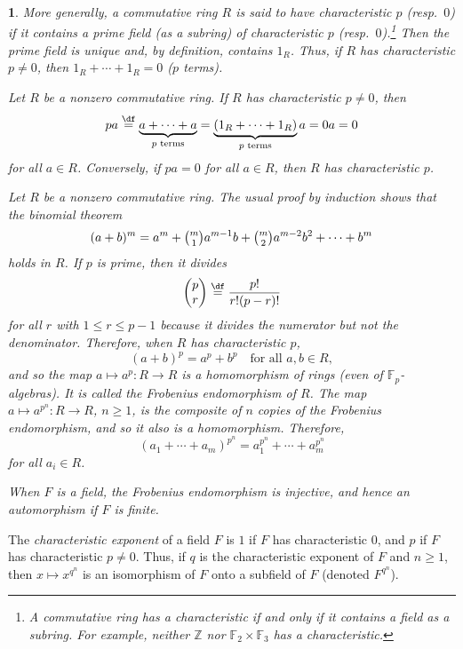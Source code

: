 \documentclass[a4paper,11pt,final,openany]{memoir}
\newtheorem{plain}[X]{}
\theoremstyle{nonumberplain}
\begin{document}
\begin{plain}
\label{ef3}More generally, a commutative ring $R$ is said to have
\emph{characteristic} $p$ (resp.~$0$) if it contains a prime field (as a
subring) of characteristic $p$ (resp.~$0$).\footnote{A commutative ring has a
characteristic if and only if it contains a field as a subring. For example,
neither $\mathbb{Z}{}$ nor $\mathbb{F}{}_{2}\times\mathbb{F}{}_{3}$ has a
characteristic.} Then the prime field is unique and, by definition, contains
$1_{R}$. Thus, if $R$ has characteristic $p\neq0$, then $1_{R}+\cdots+1_{R}=0$
($p$ terms).

Let $R$ be a nonzero commutative ring. If $R$ has characteristic $p\neq0$,
then%
\[
pa\overset{\df}{=}\underbrace{a+\cdots+a}_{p\text{ terms}%
}=\underbrace{(1_{R}+\cdots+1_{R})}_{p\text{ terms}}a=0a=0
\]
for all $a\in R$. Conversely, if $pa=0$ for all $a\in R$, then $R$ has
characteristic $p$.

Let $R$ be a nonzero commutative ring. The usual proof by induction shows that
the binomial theorem%
\[
(a+b)^{m}=a^{m}+\tbinom{m}{1}a^{m-1}b+\tbinom{m}{2}a^{m-2}b^{2}+\cdots+b^{m}%
\]
holds in $R$. If $p$ is prime, then it divides%
\[%
\begin{pmatrix}
p\\
r
\end{pmatrix}
\overset{\df}{=}\frac{p!}{r!(p-r)!}%
\]
for all $r$ with $1\leq r\leq p-1$ because it divides the numerator but not
the denominator. Therefore, when $R$ has characteristic $p$,
\[
(a+b)^{p}=a^{p}+b^{p}\quad\text{for all }a,b\in R,
\]
and so the map $a\mapsto a^{p}\colon R\rightarrow R$ is a homomorphism of
rings (even of $\mathbb{F}{}_{p}$-algebras). It is called the \emph{Frobenius
endomorphism\/}%
of $R$. The map $a\mapsto a^{p^{n}}\colon R\rightarrow R$, $n\geq1$, is the
composite of $n$ copies of the Frobenius endomorphism, and so it also is a
homomorphism. Therefore,%
\[
(a_{1}+\cdots+a_{m})^{p^{n}}=a_{1}^{p^{n}}+\cdots+a_{m}^{p^{n}}%
\]
for all $a_{i}\in R$.

When $F$ is a field, the Frobenius endomorphism is injective, and hence an
automorphism if $F$ is finite.
\end{plain}

The
%
\emph{characteristic exponent} of a field $F$ is $1$ if $F$ has characteristic
$0$, and $p$ if $F$ has characteristic $p\neq0$. Thus, if $q$ is the
characteristic exponent of $F$ and $n\geq1$, then $x\mapsto x^{q^{n}}$ is an
isomorphism of $F$ onto a subfield of $F$ (denoted
%
$F^{q^{n}}$).
\end{document}
